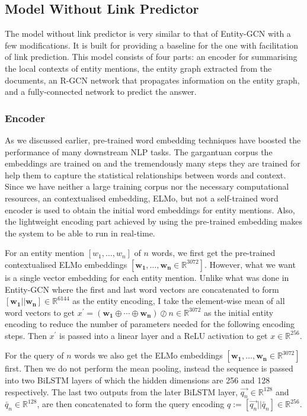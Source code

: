 \documentclass[12pt]{report}
\begin{document}
\subsection{Model Without Link Predictor}
The model without link predictor is very similar to that of Entity-GCN with a few modifications. It is built for providing a baseline for the one with facilitation of link prediction. This model consists of four parts: an encoder for summarising the local contexts of entity mentions, the entity graph extracted from the documents, an R-GCN network that propagates information on the entity graph,
and a fully-connected network to predict the answer.\subsubsection{Encoder}
As we discussed earlier, pre-trained word embedding techniques have boosted the performance of many downstream NLP tasks. The gargantuan corpus the embeddings are trained on and the tremendously many steps they are trained for help them to capture the statistical relationships between words and context. Since we have neither a large training corpus nor the necessary computational resources, an contextualised embedding, ELMo, but not a self-trained word encoder is used to obtain the initial word embeddings for entity mentions.
Also, the lightweight encoding part achieved by using the pre-trained embedding makes the system to be able to run in real-time.

For an entity mention $[w_1,\dots,w_n]$ of $n$ words, we first get the pre-trained contextualised ELMo embeddings $[{\mathbf{w_1},\dots,\mathbf{w_n}\in\mathbb{R}^{3072}}]$. However, what we want is a single vector embedding for each entity mention. Unlike what was done in Entity-GCN where the first and last word vectors are concatenated to form $[\mathbf{w_1}||\mathbf{w_n}]\in\mathbb{R}^{6144}$ as the entity encoding, I take the element-wise mean of all word vectors to get $x^{\prime}=(\mathbf{w_1}\oplus\cdots\oplus\mathbf{w_n})\oslash n\in\mathbb{R}^{3072}$ as the initial entity encoding to reduce the number of parameters needed for the following encoding steps. Then $x^\prime$ is passed into a linear layer and a ReLU activation to get $x\in\mathbb{R}^{256}$.

For the query of $n$ words we also get the ELMo embeddings $[{\mathbf{w_1},\dots,\mathbf{w_n}\in\mathbb{R}^{3072}}]$ first. Then we do not perform the mean pooling, instead the sequence is passed into two BiLSTM layers of which the hidden dimensions are 256 and 128 respectively. The last two outputs from the later BiLSTM layer, $\overrightarrow{q_n}\in\mathbb{R}^{128}$ and $\overleftarrow{q_n}\in\mathbb{R}^{128}$, are then concatenated to form the query encoding $q:=[\overrightarrow{q_n}||\overleftarrow{q_n}]\in\mathbb{R}^{256}$.
\end{document}
